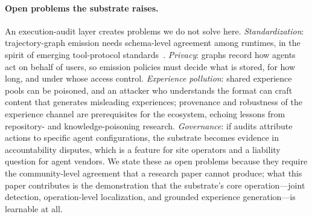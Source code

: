 \paragraph{Open problems the substrate raises.}
An execution-audit layer creates problems we do not solve here. \emph{Standardization}: trajectory-graph emission needs schema-level agreement among runtimes, in the spirit of emerging tool-protocol standards~\cite{hou2025model,zhang2025security}. \emph{Privacy}: graphs record how agents act on behalf of users, so emission policies must decide what is stored, for how long, and under whose access control. \emph{Experience pollution}: shared experience pools can be poisoned, and an attacker who understands the format can craft content that generates misleading experiences; provenance and robustness of the experience channel are prerequisites for the ecosystem, echoing lessons from repository- and knowledge-poisoning research. \emph{Governance}: if audits attribute actions to specific agent configurations, the substrate becomes evidence in accountability disputes, which is a feature for site operators and a liability question for agent vendors. We state these as open problems because they require the community-level agreement that a research paper cannot produce; what this paper contributes is the demonstration that the substrate's core operation---joint detection, operation-level localization, and grounded experience generation---is learnable at all.
